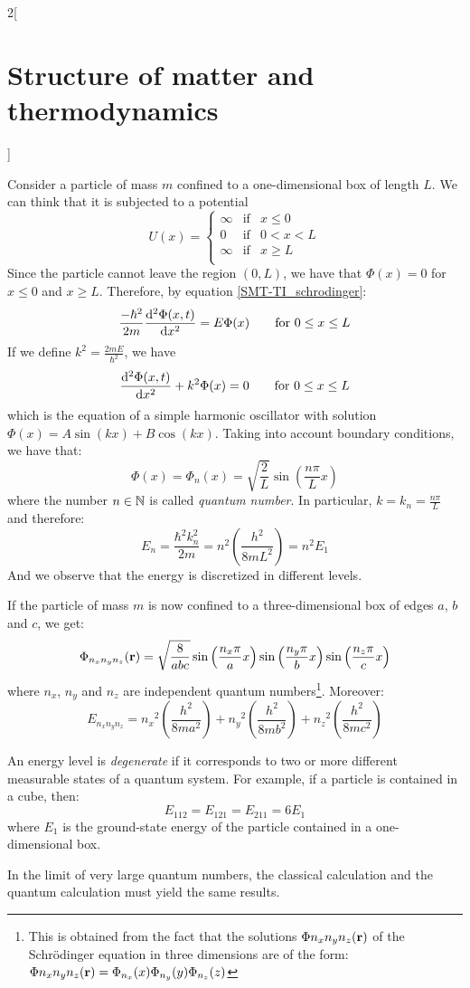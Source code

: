 \documentclass[../../../main.tex]{subfiles}
\begin{document}
\begin{multicols}{2}[\section{Structure of matter and thermodynamics}]
\begin{definition}
  \end{definition}
  \begin{prop}
    Consider a particle of mass $m$ confined to a one-dimensional box of length $L$. We can think that it is subjected to a potential $$U(x)=\left\{
      \begin{array}{lll}
        \infty & \text{if} & x\leq 0   \\
        0      & \text{if} & 0 < x < L \\
        \infty & \text{if} & x\geq L   \\
      \end{array}
      \right.$$
    Since the particle cannot leave the region $(0,L)$, we have that $\Phi(x)=0$ for $x\leq 0$ and $x\geq L$. Therefore, by equation \eqref{SMT-TI_schrodinger}:
    $$
      \frac{-\hbar^2}{2m}\dv[2]{\Phi(x,t)}{x}=E\Phi(x)\qquad\text{for }0\leq x\leq L
    $$
    If we define $k^2=\frac{2m E}{\hbar^2}$, we have
    $$
      \dv[2]{\Phi(x,t)}{x}+k^2\Phi(x)=0\qquad\text{for }0\leq x\leq L
    $$
    which is the equation of a simple harmonic oscillator with solution $\Phi(x)=A\sin(kx)+B\cos(kx)$. Taking into account boundary conditions, we have that: $$\Phi(x)=\Phi_n(x)=\sqrt{\frac{2}{L}}\sin\left(\frac{n\pi}{L}x\right)$$ where the number $n\in\mathbb{N}$ is called \textit{quantum number}. In particular, $k=k_n=\frac{n\pi}{L}$ and therefore: $$E_n=\frac{\hbar^2k_n^2}{2m}=n^2\left(\frac{h^2}{8mL^2}\right)=n^2E_1$$ And we observe that the energy is discretized in different levels.
  \end{prop}
  \begin{prop}
    If the particle of mass $m$ is now confined to a three-dimensional box of edges $a$, $b$ and $c$, we get:
    $$\Phi_{n_xn_yn_z}(\vb{r})=\sqrt{\frac{8}{abc}}\sin\left(\frac{n_x\pi}{a}x\right)\sin\left(\frac{n_y\pi}{b}x\right)\sin\left(\frac{n_z\pi}{c}x\right)$$
    where $n_x$, $n_y$ and $n_z$ are independent quantum numbers\footnote{This is obtained from the fact that the solutions $\Phi{n_xn_yn_z}(\vb{r})$ of the Schrödinger equation in three dimensions are of the form: $\Phi{n_xn_yn_z}(\vb{r})=\Phi_{n_x}(x)\Phi_{n_y}(y)\Phi_{n_z}(z)$}. Moreover:
    $$E_{n_xn_yn_z}={n_x}^2\left(\frac{h^2}{8ma^2}\right)+{n_y}^2\left(\frac{h^2}{8mb^2}\right)+{n_z}^2\left(\frac{h^2}{8mc^2}\right)$$
  \end{prop}
  \begin{definition}
    An energy level is \textit{degenerate} if it corresponds to two or more different measurable states of a quantum system. For example, if a particle is contained in a cube, then: $$E_{112}=E_{121}=E_{211}=6E_1$$ where $E_1$ is the ground-state energy of the particle contained in a one-dimensional box.
  \end{definition}
  \begin{prop}
    In the limit of very large quantum numbers, the classical calculation and the quantum calculation must yield the same results.
  \end{prop}

\end{multicols}
\end{document}

